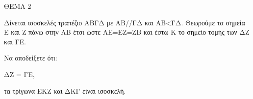
ΘΕΜΑ 2

Δίνεται ισοσκελές τραπέζιο ΑΒΓΔ με ΑΒ//ΓΔ και ΑΒ\textless ΓΔ. Θεωρούμε τα σημεία Ε και Ζ πάνω στην ΑΒ έτσι ώστε ΑΕ=ΕΖ=ΖΒ και έστω Κ το σημείο τομής των ΔΖ και ΓΕ.

Να αποδείξετε ότι:

\begin{alist}
\item ΔΖ = ΓΕ, 

\item τα τρίγωνα ΕΚΖ και ΔΚΓ είναι ισοσκελή. 
\end{alist}
